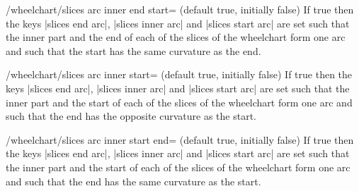\documentclass[a4paper,english,dvipsnames]{ltxdoc}
\begin{document}
\begin{key}{/wheelchart/slices arc inner end start= (default true, initially false)}
If true then the keys |slices end arc|, |slices inner arc| and |slices start arc| are set such that the inner part and the end of each of the slices of the wheelchart form one arc and such that the start has the same curvature as the end.
\begin{codeexample}[]
\end{codeexample}
\end{key}
\begin{key}{/wheelchart/slices arc inner start= (default true, initially false)}
If true then the keys |slices end arc|, |slices inner arc| and |slices start arc| are set such that the inner part and the start of each of the slices of the wheelchart form one arc and such that the end has the opposite curvature as the start.
\begin{codeexample}[width=10cm]
\end{codeexample}
\end{key}
\begin{key}{/wheelchart/slices arc inner start end= (default true, initially false)}
If true then the keys |slices end arc|, |slices inner arc| and |slices start arc| are set such that the inner part and the start of each of the slices of the wheelchart form one arc and such that the end has the same curvature as the start.
\begin{codeexample}[width=10cm]
\begin{tikzpicture}
\wheelchart[
  data=,
  gap polar=5,
  middle={%
    slices arc\\%
    inner start end%
  },
  middle style={font=\ttfamily},
  slices arc inner start end,
  value=1,
  wheel data=\WCvarC,
  wheel data pos=0.4
]{\exampleforthismanual}
\end{tikzpicture}
\end{codeexample}
\end{key}
\end{document}
